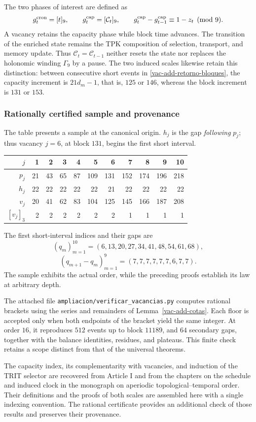 The two phases of interest are defined as
\[
 g_t^{\rm cron}=[t]_9,
 \qquad g_t^{\rm cap}=[\mathcal C_t]_9,
 \qquad
 g_t^{\rm cap}-g_{t-1}^{\rm cap}\equiv1-z_t\pmod9.
\]
A vacancy retains the capacity phase while block time advances. The transition of the enriched state remains the TPK composition of selection, transport, and memory update. Thus \(\mathcal C_t=\mathcal C_{t-1}\) neither resets the state nor replaces the holonomic winding \(\Gamma_9\) by a pause. The two induced scales likewise retain this distinction: between consecutive short events in \eqref{vac-add-retorno-bloques}, the capacity increment is \(21d_m-1\), that is, \(125\) or \(146\), whereas the block increment is \(131\) or \(153\).

\subsubsection{Rationally certified sample and provenance}
\label{vac-add-muestra}

The table presents a sample at the canonical origin. \(h_j\) is the gap \emph{following} \(p_j\); thus vacancy \(j=6\), at block \(131\), begins the first short interval.
\begin{center}
\small
\begin{tabular}{r|rrrrrrrrrr}
\toprule
\(j\)&1&2&3&4&5&6&7&8&9&10\\
\midrule
\(p_j\)&21&43&65&87&109&131&152&174&196&218\\
\(h_j\)&22&22&22&22&22&21&22&22&22&22\\
\(v_j\)&20&41&62&83&104&125&145&166&187&208\\
\([v_j]_3\)&2&2&2&2&2&2&1&1&1&1\\
\bottomrule
\end{tabular}
\end{center}
The first short-interval indices and their gaps are
\[
 (q_m)_{m=1}^{10}=(6,13,20,27,34,41,48,54,61,68),
\]
\[
 (q_{m+1}-q_m)_{m=1}^{9}=(7,7,7,7,7,7,6,7,7).
\]
The sample exhibits the actual order, while the preceding proofs establish its law at arbitrary depth.

The attached file \texttt{ampliacion/verificar\_vacancias.py} computes rational brackets using the series and remainders of Lemma~\ref{vac-add-cotas}. Each floor is accepted only when both endpoints of the bracket yield the same integer. At order \(16\), it reproduces \(512\) events up to block \(11189\), and \(64\) secondary gaps, together with the balance identities, residues, and plateaus. This finite check retains a scope distinct from that of the universal theorems.

The capacity index, its complementarity with vacancies, and induction of the TRIT selector are recovered from Article I and from the chapters on the schedule and induced clock in the monograph on aperiodic topological--temporal order. Their definitions and the proofs of both scales are assembled here with a single indexing convention. The rational certificate provides an additional check of those results and preserves their provenance.
